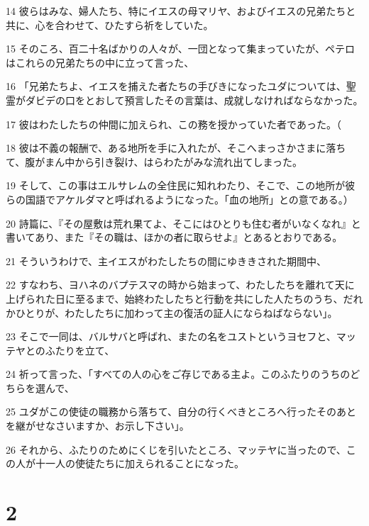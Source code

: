 \par 14 彼らはみな、婦人たち、特にイエスの母マリヤ、およびイエスの兄弟たちと共に、心を合わせて、ひたすら祈をしていた。
\par 15 そのころ、百二十名ばかりの人々が、一団となって集まっていたが、ペテロはこれらの兄弟たちの中に立って言った、
\par 16 「兄弟たちよ、イエスを捕えた者たちの手びきになったユダについては、聖霊がダビデの口をとおして預言したその言葉は、成就しなければならなかった。
\par 17 彼はわたしたちの仲間に加えられ、この務を授かっていた者であった。（
\par 18 彼は不義の報酬で、ある地所を手に入れたが、そこへまっさかさまに落ちて、腹がまん中から引き裂け、はらわたがみな流れ出てしまった。
\par 19 そして、この事はエルサレムの全住民に知れわたり、そこで、この地所が彼らの国語でアケルダマと呼ばれるようになった。「血の地所」との意である。）
\par 20 詩篇に、『その屋敷は荒れ果てよ、そこにはひとりも住む者がいなくなれ』と書いてあり、また『その職は、ほかの者に取らせよ』とあるとおりである。
\par 21 そういうわけで、主イエスがわたしたちの間にゆききされた期間中、
\par 22 すなわち、ヨハネのバプテスマの時から始まって、わたしたちを離れて天に上げられた日に至るまで、始終わたしたちと行動を共にした人たちのうち、だれかひとりが、わたしたちに加わって主の復活の証人にならねばならない」。
\par 23 そこで一同は、バルサバと呼ばれ、またの名をユストというヨセフと、マッテヤとのふたりを立て、
\par 24 祈って言った、「すべての人の心をご存じである主よ。このふたりのうちのどちらを選んで、
\par 25 ユダがこの使徒の職務から落ちて、自分の行くべきところへ行ったそのあとを継がせなさいますか、お示し下さい」。
\par 26 それから、ふたりのためにくじを引いたところ、マッテヤに当ったので、この人が十一人の使徒たちに加えられることになった。

\chapter{2}

